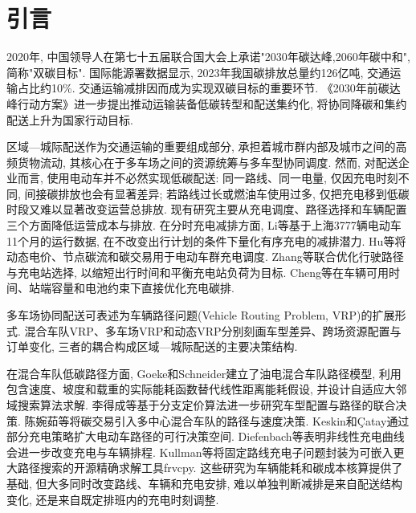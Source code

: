 \documentclass{setp-new}
\begin{document}
\maketitle
\clearpage


\section{引言}

2020年, 中国领导人在第七十五届联合国大会上承诺"2030年碳达峰,2060年碳中和", 简称"双碳目标".
国际能源署数据显示, 2023年我国碳排放总量约126亿吨, 交通运输占比约10\%.
交通运输减排因而成为实现双碳目标的重要环节.
《2030年前碳达峰行动方案》进一步提出推动运输装备低碳转型和配送集约化\cite{ref:55},
将协同降碳和集约配送上升为国家行动目标.

区域—城际配送作为交通运输的重要组成部分,
承担着城市群内部及城市之间的高频货物流动, 其核心在于多车场之间的资源统筹与多车型协同调度.
然而, 对配送企业而言, 使用电动车并不必然实现低碳配送:
同一路线、同一电量, 仅因充电时刻不同, 间接碳排放也会有显著差异;
若路线过长或燃油车使用过多, 仅把充电移到低碳时段又难以显著改变运营总排放.
现有研究主要从充电调度、路径选择和车辆配置三个方面降低运营成本与排放.
在分时充电减排方面, Li等\cite{ref:52}基于上海3777辆电动车11个月的运行数据,
在不改变出行计划的条件下量化有序充电的减排潜力.
Hu等\cite{ref:53}将动态电价、节点碳流和碳交易用于电动车群充电调度.
Zhang等\cite{ref:54}联合优化行驶路径与充电站选择, 以缩短出行时间和平衡充电站负荷为目标.
Cheng等\cite{ref:50}在车辆可用时间、站端容量和电池约束下直接优化充电碳排.

多车场协同配送可表述为车辆路径问题(Vehicle Routing Problem, VRP)的扩展形式.
混合车队VRP、多车场VRP和动态VRP分别刻画车型差异、跨场资源配置与订单变化,
三者的耦合构成区域—城际配送的主要决策结构.

在混合车队低碳路径方面, Goeke和Schneider\cite{ref:27}建立了油电混合车队路径模型,
利用包含速度、坡度和载重的实际能耗函数替代线性距离能耗假设,
并设计自适应大邻域搜索算法求解.
李得成等\cite{ref:6}基于分支定价算法进一步研究车型配置与路径的联合决策.
陈婉茹等\cite{ref:23}将碳交易引入多中心混合车队的路径与速度决策.
Keskin和\c{C}atay\cite{ref:45}通过部分充电策略扩大电动车路径的可行决策空间.
Diefenbach等\cite{ref:46}表明非线性充电曲线会进一步改变充电与车辆排程.
Kullman等\cite{ref:73}将固定路线充电子问题封装为可嵌入更大路径搜索的开源精确求解工具frvcpy.
这些研究为车辆能耗和碳成本核算提供了基础,
但大多同时改变路线、车辆和充电安排,
难以单独判断减排是来自配送结构变化, 还是来自既定排班内的充电时刻调整.
\end{document}
